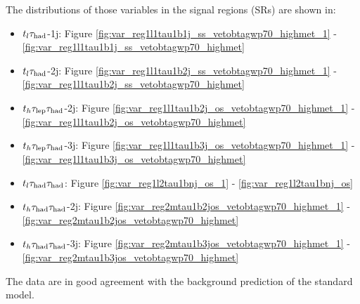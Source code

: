 \begin{enumerate}
The distributions of those variables in the signal regions (SRs) are shown in:
\begin{itemize}
	\item $t_l\tau_\text{had}$-1j: Figure  		\ref{fig:var_reg1l1tau1b1j_ss_vetobtagwp70_highmet_1}
								-	\ref{fig:var_reg1l1tau1b1j_ss_vetobtagwp70_highmet}
	\item $t_l\tau_\text{had}$-2j: Figure  		\ref{fig:var_reg1l1tau1b2j_ss_vetobtagwp70_highmet_1}
								-	\ref{fig:var_reg1l1tau1b2j_ss_vetobtagwp70_highmet}
	\item $t_h\tau_\text{lep}{}\tau_\text{had}$-2j: Figure 		\ref{fig:var_reg1l1tau1b2j_os_vetobtagwp70_highmet_1}
							 	-	\ref{fig:var_reg1l1tau1b2j_os_vetobtagwp70_highmet}
	\item $t_h\tau_\text{lep}{}\tau_\text{had}$-3j: Figure 		\ref{fig:var_reg1l1tau1b3j_os_vetobtagwp70_highmet_1}
								-	\ref{fig:var_reg1l1tau1b3j_os_vetobtagwp70_highmet}
	\item $t_l\tau_\text{had}{}\tau_\text{had}$: Figure 		\ref{fig:var_reg1l2tau1bnj_os_1}
								-	\ref{fig:var_reg1l2tau1bnj_os}
	\item $t_h\tau_\text{had}{}\tau_\text{had}$-2j: Figure 	\ref{fig:var_reg2mtau1b2jos_vetobtagwp70_highmet_1}
								-	\ref{fig:var_reg2mtau1b2jos_vetobtagwp70_highmet}
	\item $t_h\tau_\text{had}{}\tau_\text{had}$-3j: Figure 	\ref{fig:var_reg2mtau1b3jos_vetobtagwp70_highmet_1}
								-	\ref{fig:var_reg2mtau1b3jos_vetobtagwp70_highmet}
\end{itemize}

The data are in good agreement with the background prediction of the standard model.









\end{enumerate}
